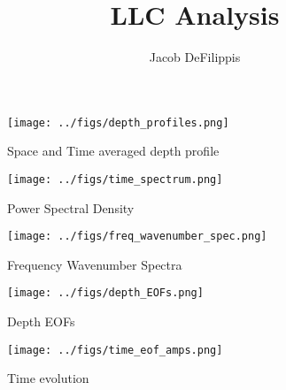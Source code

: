 \documentclass{article}
\begin{document}
\title{LLC Analysis}
\author{Jacob DeFilippis}



\begin{figure}
    \centering
    \texttt{[image: ../figs/depth\_profiles.png]}
    \caption{Space and Time averaged depth profile}
    \label{depthprof}
\end{figure}

\begin{figure}
    \centering
    \texttt{[image: ../figs/time\_spectrum.png]}
    \caption{Power Spectral Density}
    \label{psd}
\end{figure}

\begin{figure}
    \centering
    \texttt{[image: ../figs/freq\_wavenumber\_spec.png]}
    \caption{Frequency Wavenumber Spectra}
    \label{psd}
\end{figure}



\begin{figure*}[t!]
    \centering
    \begin{subfigure}[t]{0.4\textwidth}
        \centering
        \texttt{[image: ../figs/depth\_EOFs.png]}
        \caption{Depth EOFs}
    \end{subfigure}
    
    \begin{subfigure}[t]{0.4\textwidth}
        \centering
        \texttt{[image: ../figs/time\_eof\_amps.png]}
        \caption{Time evolution}
    \end{subfigure}
\end{figure*}
\end{document}

